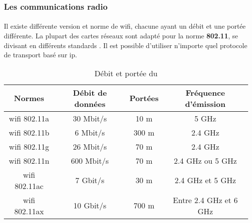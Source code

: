 \subsubsection{Les communications radio}
\label{sec:communicationRadio}

\paragraph{}
\label{sec:wifi}

Il existe différente version et norme de \gls{wifi}, chacune ayant un débit et une portée différente.
La plupart des cartes réseaux sont adapté pour la norme \textbf{802.11}, se divisant en différents standards
\cite{wifi}. Il est possible d’utiliser n’importe quel protocole de transport basé sur \gls{ip}.\newline

\begin{table}[H]
    \centering
    \begin{tabular}{|c|c|c|c|}
        \hline
        \rowcolor{tableColorDark} Normes & Débit de données & Portées & Fréquence d'émission   \\
        \hline

        \gls{wifi} 802.11a               & 30 Mbit/s        & 10 m    & 5 GHz                  \\\hline
        \gls{wifi} 802.11b               & 6 Mbit/s         & 300 m   & 2.4 GHz                \\\hline
        \gls{wifi} 802.11g               & 26 Mbit/s        & 70 m    & 2.4 GHz                \\\hline
        \gls{wifi} 802.11n               & 600 Mbit/s       & 70 m    & 2.4 GHz ou 5 GHz       \\\hline
        \gls{wifi} 802.11ac              & 7 Gbit/s         & 30 m    & 2.4 GHz et 5 GHz       \\\hline
        \gls{wifi} 802.11ax              & 10 Gbit/s        & 700 m   & Entre 2.4 GHz et 6 GHz \\\hline
    \end{tabular}
    \label{tab:debitPorteeWifi}
    \caption{Débit et portée du }
    \nocite{debitPortee}
\end{table}

\paragraph{}
\label{sec:wimax}

